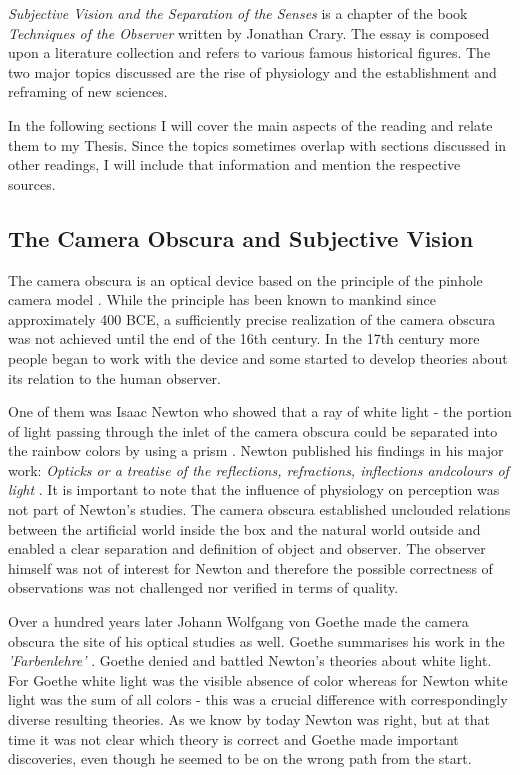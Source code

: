 \documentclass[12pt,a4paper]{article}
\begin{document}
{\it{Subjective Vision and the Separation of the Senses}} is a chapter of the book {\it{Techniques of the
Observer}} \cite{crary} written by Jonathan Crary. The essay is composed upon a literature collection and
refers to various famous historical figures. The two major topics discussed are the rise of physiology and
the establishment and reframing of new sciences.

In the following sections I will cover the main aspects of the reading and relate them to my Thesis.
Since the topics sometimes overlap with sections discussed in other readings, I will include that
information and mention the respective sources.

\subsection*{The Camera Obscura and Subjective Vision}

The camera obscura is an optical device based on the principle of the pinhole camera model \cite{camera}. While
the principle has been known to mankind since approximately 400 BCE, a sufficiently precise realization of the
camera obscura was not achieved until the end of the 16th century. In the 17th century more people began to
work with the device and some started to develop theories about its relation to the human observer.

One of them was Isaac Newton who showed that a ray of white light - the portion of light passing through the
inlet of the camera obscura could be separated into the rainbow colors by using a prism \cite{newtongoethe}.
Newton published his findings in his major work: {\it{Opticks or a treatise of the reflections, refractions,
inflections andcolours of light}} \cite{opticks}.
It is important to note that the influence of physiology on perception
was not part of Newton's studies. The camera obscura established unclouded relations between
the artificial world inside the box and the natural world outside and enabled a clear separation
and definition of object and observer. The observer himself was not of interest for Newton and therefore the
possible correctness of observations was not challenged nor verified in terms of quality.

Over a hundred years later Johann Wolfgang von Goethe made the camera obscura the site of his optical studies
as well. Goethe summarises his work in the {\it{'Farbenlehre'}} \cite{farbenlehre}. 
Goethe denied and battled Newton's theories about white light. For Goethe white light was the visible
absence of color whereas for Newton white light was the sum of all colors - this was a crucial difference
with correspondingly diverse resulting theories. As we know by today Newton was right, but at that time it
was not clear which theory is correct and Goethe made important discoveries, even though he seemed to be on
the wrong path from the start.
\end{document}
